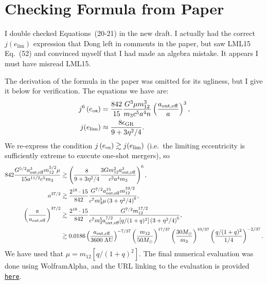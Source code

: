 \documentclass[11pt,
        usenames, %
        dvipsnames %
    ]{article}
\newcommand*{\p}[1]{\left(#1\right)}
\newcommand*{\s}[1]{\left[#1\right]}
\begin{document}
\section{Checking Formula from Paper}

I double checked Equations~(20-21) in the new draft. I actually had the correct
$j(e_{\lim})$ expression that Dong left in comments in the paper, but saw LML15
Eq.~(52) and convinced myself that I had made an algebra mistake. It appears I
must have misread LML15.

The derivation of the formula in the paper was omitted for its ugliness, but I
give it below for verification. The equations we have are:
\begin{align}
    j^6\p{e_{\rm os}} &= \frac{842}{15}\frac{G^3 \mu m_{12}^3}{m_3c^5a^4n}
        \p{\frac{a_{\rm out, eff}}{a}}^3,\\
    j(e_{\lim}) &\approx \frac{8\epsilon_{\rm GR}}{9 + 3\eta^2/4}.
\end{align}
We re-express the condition $j\p{e_{\rm os}} \gtrsim j(e_{\lim})$ (i.e.\ the
limiting eccentricity is sufficiently extreme to execute one-shot mergers), so
\begin{align}
    842 \frac{G^{5/2}a_{\rm out, eff}^3 m_{12}^{5/2}\mu}{
        15a^{11/2}c^5 m_3}
        &\gtrsim \p{\frac{8}{9 + 3\eta^2/4}
            \frac{3Gm_{12}^2a_{\rm out, eff}^3}{c^2a^4m_3}}^6,\\
    a^{37/2} &\gtrsim \frac{2^{18} \cdot 15}{842} \frac{G^{7/2}a_{\rm
        out, eff}^{15} m_{12}^{19/2}}{c^7 m_3^5 \mu \p{3 + \eta^2/4}^6}
        ,\\
    \p{\frac{a}{a_{\rm out, eff}}}^{37/2} &\gtrsim \frac{2^{18} \cdot 15}{842}
            \frac{G^{7/2} m_{12}^{17/2}}{c^7 m_3^5 a_{\rm out, eff}^{7/2} [q /
            (1 + q)^2] \p{3 + \eta^2/4}^6},\\
        &\gtrsim
            0.0186
            \p{\frac{a_{\rm out, eff}}{3600\;\mathrm{AU}}}^{-7/37}
            \p{\frac{m_{12}}{50M_{\odot}}}^{17/37}
            \p{\frac{30M_{\odot}}{m_3}}^{10/37}
            \p{\frac{q / (1 + q)^2}{1/4}}^{-2/37}.
\end{align}
We have used that $\mu = m_{12}\s{q / (1 + q)^2}$. The final numerical
evaluation was done using WolframAlpha, and the URL linking to the evaluation is
provided
\href{https://www.wolframalpha.com/input/?i=%282%5E%2818%29+*+15+%2F+842+*+G%5E%287%2F2%29+*+%283600+AU%29%5E%28-7%2F2%29+*+%2850+solar+mass%29%5E%2817%2F2%29+%2F+%28c%5E7+*+%2830+solar+mass%29%5E5+*+%281%2F4%29+*+%283%5E6%29%29%29%5E%282%2F37%29}{\texttt{here}}.
\end{document}
